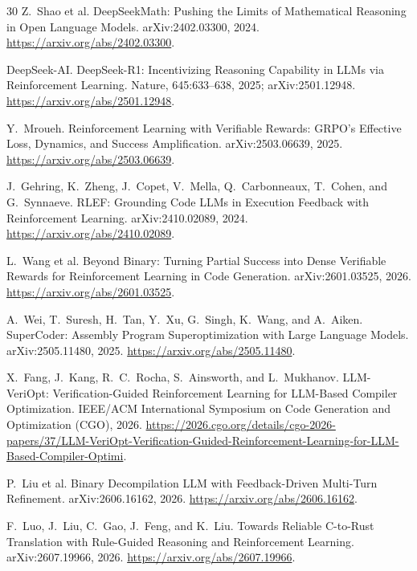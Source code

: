 \documentclass{article}
\begin{document}
\begin{thebibliography}{30}
Z.~Shao et al.
\newblock DeepSeekMath: Pushing the Limits of Mathematical Reasoning in Open Language Models.
\newblock arXiv:2402.03300, 2024.
\newblock \url{https://arxiv.org/abs/2402.03300}.

DeepSeek-AI.
\newblock DeepSeek-R1: Incentivizing Reasoning Capability in LLMs via Reinforcement Learning.
\newblock Nature, 645:633--638, 2025; arXiv:2501.12948.
\newblock \url{https://arxiv.org/abs/2501.12948}.

Y.~Mroueh.
\newblock Reinforcement Learning with Verifiable Rewards: GRPO's Effective Loss, Dynamics, and Success Amplification.
\newblock arXiv:2503.06639, 2025.
\newblock \url{https://arxiv.org/abs/2503.06639}.

J.~Gehring, K.~Zheng, J.~Copet, V.~Mella, Q.~Carbonneaux, T.~Cohen, and G.~Synnaeve.
\newblock RLEF: Grounding Code LLMs in Execution Feedback with Reinforcement Learning.
\newblock arXiv:2410.02089, 2024.
\newblock \url{https://arxiv.org/abs/2410.02089}.

L.~Wang et al.
\newblock Beyond Binary: Turning Partial Success into Dense Verifiable Rewards for Reinforcement Learning in Code Generation.
\newblock arXiv:2601.03525, 2026.
\newblock \url{https://arxiv.org/abs/2601.03525}.

A.~Wei, T.~Suresh, H.~Tan, Y.~Xu, G.~Singh, K.~Wang, and A.~Aiken.
\newblock SuperCoder: Assembly Program Superoptimization with Large Language Models.
\newblock arXiv:2505.11480, 2025.
\newblock \url{https://arxiv.org/abs/2505.11480}.

X.~Fang, J.~Kang, R.~C.~Rocha, S.~Ainsworth, and L.~Mukhanov.
\newblock LLM-VeriOpt: Verification-Guided Reinforcement Learning for LLM-Based Compiler Optimization.
\newblock IEEE/ACM International Symposium on Code Generation and Optimization (CGO), 2026.
\newblock \url{https://2026.cgo.org/details/cgo-2026-papers/37/LLM-VeriOpt-Verification-Guided-Reinforcement-Learning-for-LLM-Based-Compiler-Optimi}.

P.~Liu et al.
\newblock Binary Decompilation LLM with Feedback-Driven Multi-Turn Refinement.
\newblock arXiv:2606.16162, 2026.
\newblock \url{https://arxiv.org/abs/2606.16162}.

F.~Luo, J.~Liu, C.~Gao, J.~Feng, and K.~Liu.
\newblock Towards Reliable C-to-Rust Translation with Rule-Guided Reasoning and Reinforcement Learning.
\newblock arXiv:2607.19966, 2026.
\newblock \url{https://arxiv.org/abs/2607.19966}.


\end{thebibliography}
\end{document}

